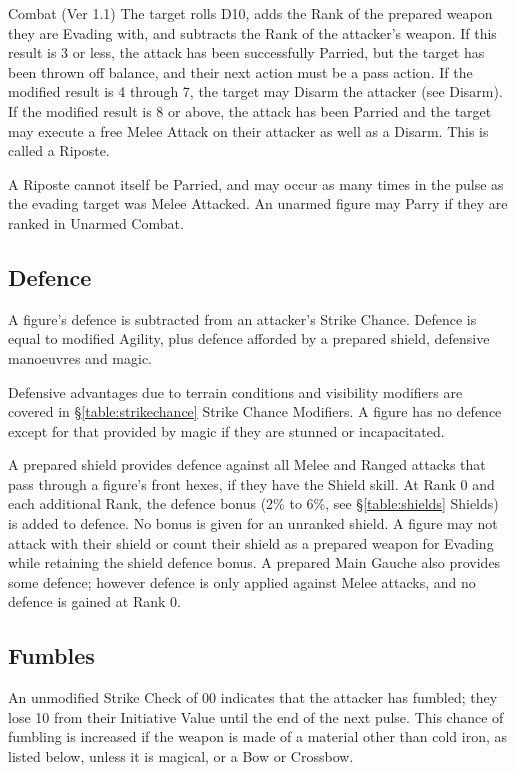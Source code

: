 \begin{Chapter}{Combat (Ver 1.1)}
The target rolls D10, adds the Rank of the prepared weapon they are
Evading with, and subtracts the Rank of the attacker’s weapon. If this
result is 3 or less, the attack has been successfully Parried, but the
target has been thrown off balance, and their next action must be a
pass action.  If the modified result is 4 through 7, the target may
Disarm the attacker (see Disarm). If the modified result is 8 or
above, the attack has been Parried and the target may execute a free
Melee Attack on their attacker as well as a Disarm. This is called a
Riposte.

A Riposte cannot itself be Parried, and may occur as many times in the
pulse as the evading target was Melee Attacked. An unarmed figure may
Parry if they are ranked in Unarmed Combat.

\subsection{Defence}

A figure’s defence is subtracted from an attacker’s Strike Chance.
Defence is equal to modified Agility, plus defence afforded by a
prepared shield, defensive manoeuvres and magic.

Defensive advantages due to terrain conditions and visibility
modifiers are covered in \S\ref{table:strikechance} Strike Chance
Modifiers.  A figure has no defence except for that provided by magic
if they are stunned or incapacitated.

A prepared shield provides defence against all Melee and Ranged
attacks that pass through a figure’s front hexes, if they have the
Shield skill.  At Rank 0 and each additional Rank, the defence bonus
(2\% to 6\%, see \S\ref{table:shields} Shields) is added to defence.
No bonus is given for an unranked shield.  A figure may not attack
with their shield or count their shield as a prepared weapon for
Evading while retaining the shield defence bonus.  A prepared Main
Gauche also provides some defence; however defence is only applied
against Melee attacks, and no defence is gained at Rank 0.

\subsection{Fumbles}

An unmodified Strike Check of 00 indicates that the attacker has
fumbled; they lose 10 from their Initiative Value until the end of the
next pulse. This chance of fumbling is increased if the weapon is made
of a material other than cold iron, as listed below, unless it is
magical, or a Bow or Crossbow.


\end{Chapter}
